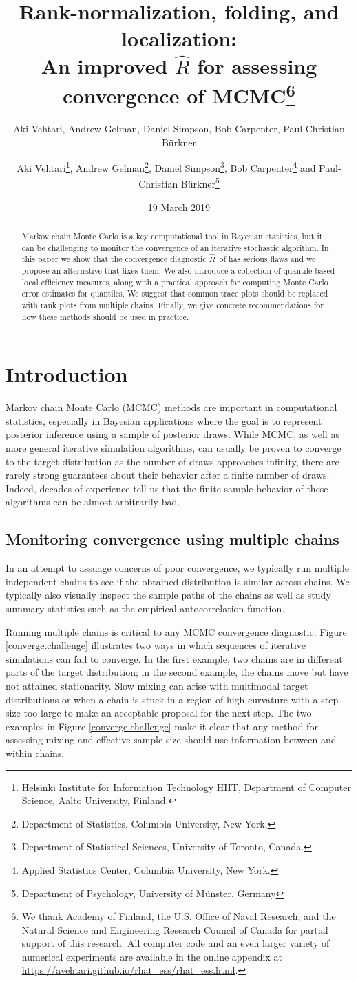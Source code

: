 \documentclass[american,]{article}
\title{Rank-normalization, folding, and localization:\\
  An improved $\widehat{R}$ for assessing convergence of MCMC\footnote{We thank Academy of Finland, the U.S. Office of Naval Research, and the Natural Science and Engineering Research Council of Canada for partial support of this research.  All computer code and an 
even larger variety of numerical experiments are available in the online 
appendix at \url{https://avehtari.github.io/rhat_ess/rhat_ess.html}.}\vspace{.1in}}
\author{Aki Vehtari, Andrew Gelman, Daniel Simpson, Bob Carpenter, Paul-Christian Bürkner}
\author{
Aki Vehtari\footnote{Helsinki Institute for Information Technology HIIT,
  Department of Computer Science, Aalto University, Finland.},
   Andrew Gelman\footnote{Department of Statistics, Columbia University, New York.},
 Daniel Simpson\footnote{Department of Statistical Sciences, University of Toronto, Canada.},
 Bob Carpenter\footnote{Applied Statistics Center, Columbia
   University, New York.}
and Paul-Christian B\"{u}rkner\footnote{Department of Psychology, University of M\"{u}nster, Germany}
}
\date{}
\date{19 March 2019}
\newcommand{\Rhat}{$\widehat{R}$}
\theoremstyle{definition}
\begin{document}
\maketitle
\begin{abstract}
  Markov chain Monte Carlo is a key computational tool in Bayesian 
  statistics, but it can be challenging to monitor the convergence of an iterative stochastic algorithm.
In this paper we show that the convergence diagnostic \Rhat\ 
of \citet{Gelman+Rubin:1992} has serious flaws and we
propose an alternative that fixes them. We also introduce
  a collection of quantile-based local efficiency
  measures, along with a practical approach for computing Monte Carlo error
  estimates for quantiles. We suggest that common trace plots should
  be replaced with rank plots from multiple chains. Finally, we give
  concrete recommendations for how these methods should be used
  in practice.
\end{abstract}

\hypertarget{introduction}{%
\section{Introduction}\label{introduction}}

Markov chain Monte Carlo (MCMC) methods are important in computational statistics, especially 
in Bayesian applications where the goal is to represent
posterior inference using a sample of posterior draws. While MCMC, 
as well as more general iterative
simulation algorithms, can usually be proven to converge
to the target distribution as the number of draws approaches infinity,
there are rarely strong guarantees about their behavior after a 
finite number of draws. Indeed, decades of experience tell us that
the finite sample behavior of these algorithms can be almost arbitrarily bad.


\subsection{Monitoring convergence using multiple chains}


In an attempt to assuage concerns of poor convergence, we typically run multiple 
independent chains  to see if the obtained 
distribution is similar across chains.  We typically also visually inspect
the sample paths of the chains as well as study summary statistics such as
 the empirical autocorrelation function. 

Running multiple chains is critical to any MCMC convergence diagnostic. Figure
\ref{converge.challenge} illustrates two ways in which sequences of
iterative simulations can fail to converge.  In the first example, two chains
are in different parts of the target distribution; in the second
example, the chains move but have not attained stationarity. Slow mixing can arise with multimodal target distributions or when a chain is
stuck in a region of high curvature with a step size too large to make an
acceptable proposal for the next step. The two examples in Figure \ref{converge.challenge}  make it clear that 
any method for assessing mixing and effective sample size should use information
between and within chains.
\end{document}
